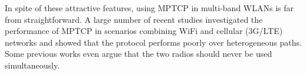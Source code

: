In spite of these attractive features, using MPTCP in multi-band WLANs
is far from straightforward. A large number of recent studies
investigated the performance of MPTCP in scenarios combining WiFi and
cellular (3G/LTE) networks
and showed that the
protocol performs poorly over heterogeneous paths.
Some previous works
even argue that the two
radios should never be used simultaneously.

